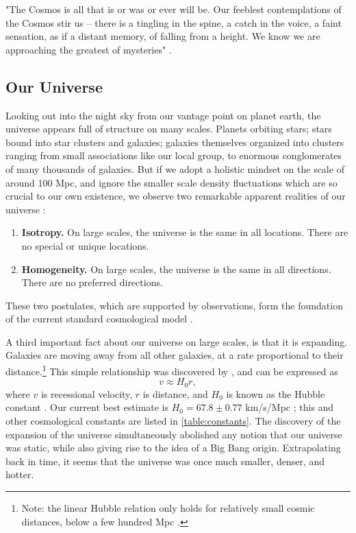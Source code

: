 "The Cosmos is all that is or was or ever will be. Our feeblest contemplations of the Cosmos stir us -- there is a tingling in the spine, a catch in the voice, a faint sensation, as if a distant memory, of falling from a height. We know we are approaching the greatest of mysteries" \citep{Sagan80}.


\subsection{Our Universe}

Looking out into the night sky from our vantage point on planet earth, the universe appears full of structure on many scales. Planets orbiting stars; stars bound into star clusters and galaxies; galaxies themselves organized into clusters ranging from small associations like our local group, to enormous conglomerates of many thousands of galaxies. But if we adopt a holistic mindset on the scale of around 100 \acf{Mpc}, and ignore the smaller scale density fluctuations which are so crucial to our own existence, we observe two remarkable apparent realities of our universe \citep{RydenText}:
\begin{enumerate}
\item {\bf Isotropy.} On large scales, the universe is the same in all locations. There are no special or unique locations.
\item {\bf Homogeneity.} On large scales, the universe is the same in all directions. There are no preferred directions.
\end{enumerate}
These two postulates, which are supported by observations, form the foundation of the current standard cosmological model \citep{BS01}.

A third important fact about our universe on large scales, is that it is expanding. Galaxies are moving away from all other galaxies, at a rate proportional to their distance.\footnote{Note: the linear Hubble relation only holds for relatively small cosmic distances, below a few hundred \ac{Mpc} \citep{RydenText}.} This simple relationship was discovered by \citet{Hubble29}, and can be expressed as
\begin{equation}
v \approx H_0 r,
\end{equation}
where $v$ is recessional velocity, $r$ is distance, and $H_0$ is known as the Hubble constant \citep{RydenText}. Our current best estimate is $H_0 = 67.8\pm0.77$ km/s/Mpc \citep{PlanckXVI}; this and other cosmological constants are listed in \autoref{table:constants}. The discovery of the expansion of the universe simultaneously abolished any notion that our universe was static, while also giving rise to the idea of a Big Bang origin. Extrapolating back in time, it seems that the universe was once much smaller, denser, and hotter. 

